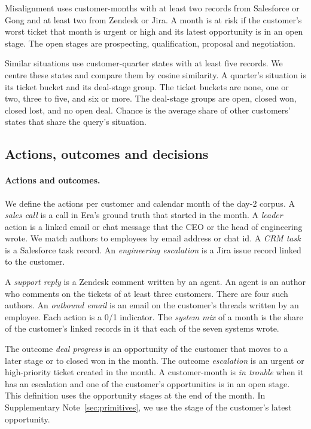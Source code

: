 \documentclass[11pt]{article}
\begin{document}
Misalignment uses customer-months with at least two records from Salesforce or Gong and at least two from Zendesk or Jira. A month is at risk if the customer's worst ticket that month is urgent or high and its latest opportunity is in an open stage. The open stages are prospecting, qualification, proposal and negotiation.

Similar situations use customer-quarter states with at least five records. We centre these states and compare them by cosine similarity. A quarter's situation is its ticket bucket and its deal-stage group. The ticket buckets are none, one or two, three to five, and six or more. The deal-stage groups are open, closed won, closed lost, and no open deal. Chance is the average share of other customers' states that share the query's situation.

\subsection{Actions, outcomes and decisions}
\paragraph{Actions and outcomes.} We define the actions per customer and calendar month of the day-2 corpus. A \emph{sales call} is a call in Era's ground truth that started in the month. A \emph{leader} action is a linked email or chat message that the CEO or the head of engineering wrote. We match authors to employees by email address or chat id. A \emph{CRM task} is a Salesforce task record. An \emph{engineering escalation} is a Jira issue record linked to the customer.

A \emph{support reply} is a Zendesk comment written by an agent. An agent is an author who comments on the tickets of at least three customers. There are four such authors. An \emph{outbound email} is an email on the customer's threads written by an employee. Each action is a 0/1 indicator. The \emph{system mix} of a month is the share of the customer's linked records in it that each of the seven systems wrote.

The outcome \emph{deal progress} is an opportunity of the customer that moves to a later stage or to closed won in the month. The outcome \emph{escalation} is an urgent or high-priority ticket created in the month. A customer-month is \emph{in trouble} when it has an escalation and one of the customer's opportunities is in an open stage. This definition uses the opportunity stages at the end of the month. In Supplementary Note~\ref{sec:primitives}, we use the stage of the customer's latest opportunity.
\end{document}
